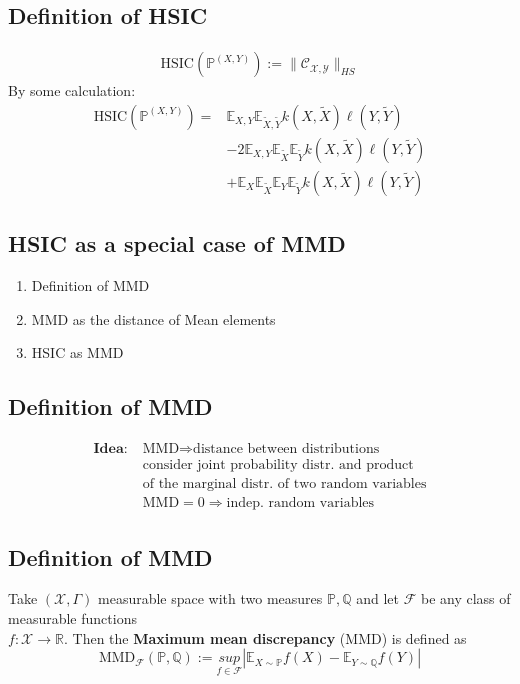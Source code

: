 \clearpage

\subsection*{Definition of HSIC}
\begin{align*}
\text{HSIC}(\mathbb{P}^{(X,Y)}):=\|\mathcal{C}_{\mathcal{X},\mathcal{Y}}\|_{HS}
\end{align*}
By some calculation:
\begin{align*}
\text{HSIC}(\mathbb{P}^{(X,Y)})=&
\mathbb{E}_{X,Y}\mathbb{E}_{\tilde X,\tilde Y}k(X,\tilde X)\ell (Y,\tilde Y)\\&-2\mathbb{E}_{X,Y}\mathbb{E}_{\tilde X}\mathbb{E}_{\tilde Y}k(X,\tilde X)\ell (Y,\tilde Y)\\&+\mathbb{E}_X\mathbb{E}_{\tilde X}\mathbb{E}_Y\mathbb{E}_{\tilde Y}k(X,\tilde X)\ell (Y,\tilde Y)
\end{align*}

\clearpage

\subsection{HSIC as a special case of MMD}
\begin{enumerate}
\item Definition of MMD
\item MMD as the distance of Mean elements
\item HSIC as MMD
\end{enumerate}

\clearpage

\subsection*{Definition of MMD}

\begin{align*}
\textbf{Idea:}\;& \text{MMD}\Rightarrow\text{distance between distributions}\\&\text{consider joint probability distr. and product}\\& \text{of the marginal distr. of two random variables}\\&\text{MMD}=0\Rightarrow\text{indep. random variables}
\end{align*}
\clearpage

\subsection*{Definition of MMD}
Take $(\mathcal{X},\Gamma)$ measurable space with two measures $\mathbb{P},\mathbb{Q}$ and let $\mathcal{F}$ be any class of measurable functions\\ $f:\mathcal X\rightarrow\mathbb{R}$. Then the \textbf{Maximum mean discrepancy} (MMD) is defined as
\begin{equation*}
\text{MMD}_\mathcal{F}(\mathbb{P},\mathbb{Q}):=\underset{f\in\mathcal{F}}{sup}|\mathbb E_{X\sim\mathbb P}f(X)-\mathbb E_{Y\sim\mathbb Q}f(Y)|
\end{equation*}

